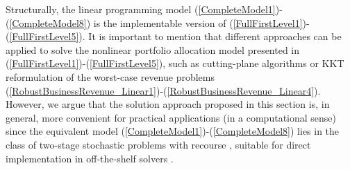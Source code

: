 	Structurally, the linear programming model (\ref{CompleteModel1})-(\ref{CompleteModel8}) is the implementable version of (\ref{FullFirstLevel1})-(\ref{FullFirstLevel5}). It is important to mention that different approaches can be applied to solve the nonlinear portfolio allocation model presented in (\ref{FullFirstLevel1})-(\ref{FullFirstLevel5}), such as cutting-plane algorithms or KKT reformulation of the worst-case revenue problems (\ref{RobustBusinessRevenue_Linear1})-(\ref{RobustBusinessRevenue_Linear4}). However, we argue that the solution approach proposed in this section is, in general, more convenient for practical applications (in a computational sense) since the equivalent model (\ref{CompleteModel1})-(\ref{CompleteModel8}) lies in the class of two-stage stochastic problems with recourse \cite{Birge_StochProgm}, suitable for direct implementation in off-the-shelf solvers \cite{Xpress}.